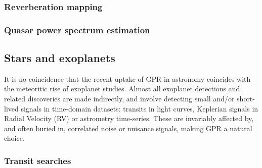 \documentclass[letterpaper]{ar-1col}
\begin{document}
\subsubsection{Reverberation mapping}

\subsubsection{Quasar power spectrum estimation}

\subsection{Stars and exoplanets}

It is no coincidence that the recent uptake of GPR in astronomy coincides with the meteoritic rise of exoplanet studies. Almost all exoplanet detections and related discoveries are made indirectly, and involve detecting small and/or short-lived signals in time-domain datasets: transits in light curves, Keplerian signals in Radial Velocity (RV) or astrometry time-series. These are invariably affected by, and often buried in, correlated noise or nuisance signals, making GPR a natural choice.


\subsubsection{Transit searches}
\end{document}
